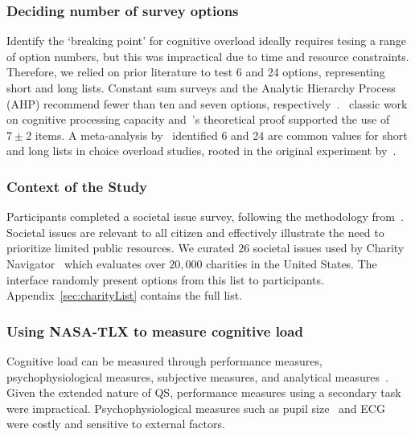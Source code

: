 \subsubsection{Deciding number of survey options}
Identify the `breaking point' for cognitive overload ideally requires tesing a range of option numbers, but this was impractical due to time and resource constraints. Therefore, we relied on prior literature to test 6 and 24 options, representing short and long lists. Constant sum surveys and the Analytic Hierarchy Process (AHP) recommend fewer than ten and seven options, respectively~\cite{moroneyQuestionnaireDesignHow2019, saatyGroupDecisionMaking2013, saatyPrinciplesAnalyticHierarchy1987}.~\textcite{millerMagicalNumberSeven1956} classic work on cognitive processing capacity and~\textcite{saaty2003magic}'s theoretical proof supported the use of $7\pm2$ items. A meta-analysis by~\textcite{chernevChoiceOverloadConceptual2015}  identified 6 and 24 are common values for short and long lists in choice overload studies, rooted in the original experiment by~\textcite{iyengarWhenChoiceDemotivating2000}.%

\subsubsection{Context of the Study}
Participants completed a societal issue survey, following the methodology from~\textcite{chengCanShowWhat2021}. Societal issues are relevant to all citizen and effectively illustrate the need to prioritize limited public resources. We curated $26$ societal issues used by Charity Navigator~\cite{CharityNavigator2023} which evaluates over $20,000$ charities in the United States. The interface randomly present options from this list to participants. Appendix~\ref{sec:charityList} contains the full list.

\subsubsection{Using NASA-TLX to measure cognitive load}
Cognitive load can be measured through performance measures, psychophysiological measures, subjective measures, and analytical measures~\cite{gaoMentalWorkloadMeasurement2013}. Given the extended nature of QS, performance measures using a secondary task were impractical. Psychophysiological measures such as pupil size~\cite{palinkoEstimatingCognitiveLoad2010} and ECG~\cite{haapalainenPsychophysiologicalMeasuresAssessing2010} were costly and sensitive to external factors. 

